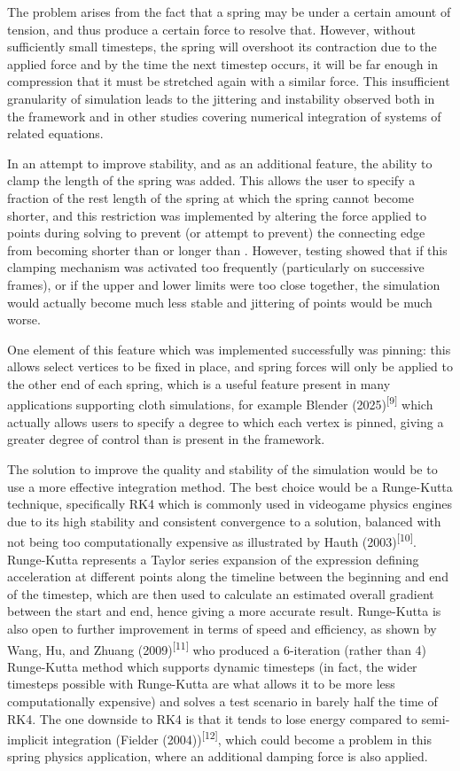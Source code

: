 \documentclass[
]{article}
\begin{document}
The problem arises from the fact that a spring may be under a certain
amount of tension, and thus produce a certain force to resolve that.
However, without sufficiently small timesteps, the spring will overshoot
its contraction due to the applied force and by the time the next
timestep occurs, it will be far enough in compression that it must be
stretched again with a similar force. This insufficient granularity of
simulation leads to the jittering and instability observed both in the
framework and in other studies covering numerical integration of systems
of related equations.

In an attempt to improve stability, and as an additional feature, the
ability to clamp the length of the spring was added. This allows the
user to specify a fraction of the rest length of the spring at which the
spring cannot become shorter, and this restriction was implemented by
altering the force applied to points during solving to prevent (or
attempt to prevent) the connecting edge from becoming shorter than {} or
longer than {}. However, testing showed that if this clamping mechanism
was activated too frequently (particularly on successive frames), or if
the upper and lower limits were too close together, the simulation would
actually become much less stable and jittering of points would be much
worse.

One element of this feature which was implemented successfully was
pinning: this allows select vertices to be fixed in place, and spring
forces will only be applied to the other end of each spring, which is a
useful feature present in many applications supporting cloth
simulations, for example Blender (2025)\textsuperscript{{[}9{]}} which
actually allows users to specify a degree to which each vertex is
pinned, giving a greater degree of control than is present in the
framework.

The solution to improve the quality and stability of the simulation
would be to use a more effective integration method. The best choice
would be a Runge-Kutta technique, specifically RK4 which is commonly
used in videogame physics engines due to its high stability and
consistent convergence to a solution, balanced with not being too
computationally expensive as illustrated by Hauth
(2003)\textsuperscript{{[}10{]}}. Runge-Kutta represents a Taylor series
expansion of the expression defining acceleration at different points
along the timeline between the beginning and end of the timestep, which
are then used to calculate an estimated overall gradient between the
start and end, hence giving a more accurate result. Runge-Kutta is also
open to further improvement in terms of speed and efficiency, as shown
by Wang, Hu, and Zhuang (2009)\textsuperscript{{[}11{]}} who produced a
6-iteration (rather than 4) Runge-Kutta method which supports dynamic
timesteps (in fact, the wider timesteps possible with Runge-Kutta are
what allows it to be more less computationally expensive) and solves a
test scenario in barely half the time of RK4. The one downside to RK4 is
that it tends to lose energy compared to semi-implicit integration
(Fielder (2004))\textsuperscript{{[}12{]}}, which could become a problem
in this spring physics application, where an additional damping force is
also applied.
\end{document}
